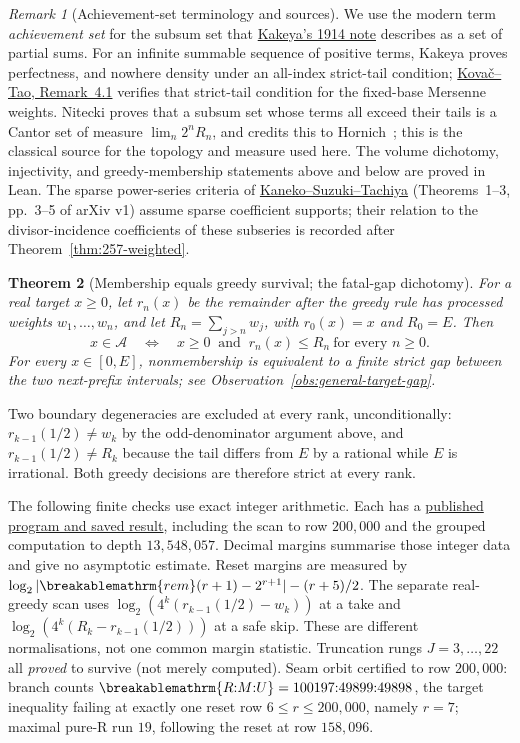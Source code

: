\documentclass[11pt]{article}
\theoremstyle{plain}
\newtheorem{thm}{Theorem}[section]
\theoremstyle{definition}
\theoremstyle{remark}
\newtheorem{rem}[thm]{Remark}
\renewcommand{\mathrm}[1]{\ifmmode\breakablemathrm{#1}\else\textrm{#1}\fi}%
\begin{document}
\begin{rem}[Achievement-set terminology and sources]
We use the modern term \emph{achievement set} for the subsum set that
\href{https://doi.org/10.11429/ptmps1907.7.14_250}{Kakeya's 1914 note} describes
as a set of partial sums.  For an infinite summable sequence of positive
terms, Kakeya proves perfectness, and nowhere density under an all-index strict-tail
condition; \href{https://arxiv.org/abs/2406.17593v4}{Kova\v{c}--Tao,
Remark~4.1} verifies that strict-tail condition for the fixed-base Mersenne
weights.  Nitecki proves that a subsum set whose terms all exceed their tails
is a Cantor set of measure $\lim_n2^nR_n$, and credits this to
Hornich~\cite[Theorem~4(1), p.~9]{nitecki2013}; this is the classical source for
the topology and measure used here.  The
volume dichotomy, injectivity, and greedy-membership statements above and
below are proved in Lean.  The sparse power-series criteria
of \href{https://arxiv.org/abs/2601.20743}{Kaneko--Suzuki--Tachiya}
(Theorems~1--3, pp.~3--5 of arXiv v1) assume sparse coefficient supports;
their relation to the divisor-incidence coefficients of these subseries is
recorded after Theorem~\ref{thm:257-weighted}.
\end{rem}

\begin{thm}[Membership equals greedy survival; the fatal-gap dichotomy]
\label{thm:greedy-survival}
For a real target $x\ge0$, let $r_n(x)$ be the remainder after the
greedy rule has processed weights $w_1,\ldots,w_n$, and let
$R_n=\sum_{j>n}w_j$, with $r_0(x)=x$ and $R_0=E$.  Then
\[
 x\in\mathcal A\quad\Longleftrightarrow\quad
 x\ge0\ \text{ and }\ r_n(x)\le R_n\ \text{for every }n\ge0.
\]
For every $x\in[0,E]$, nonmembership is equivalent to a finite
strict gap between the two next-prefix intervals; see
Observation~\ref{obs:general-target-gap}.
\end{thm}

Two boundary degeneracies are excluded at every rank, unconditionally: $r_{k-1}(1/2)\ne w_k$ by the
odd-denominator argument above, and $r_{k-1}(1/2)\ne R_k$ because the tail differs from $E$ by a
rational while $E$ is irrational. Both greedy decisions are therefore strict at every rank.

The following finite checks use exact integer arithmetic.  Each has a
\href{https://github.com/wcook04/plectis-erdos/tree/f757115e03bebe5c04431a147da559015c680a37/research/experiments/erdos257}{published program and saved result},
including the scan to row $200{,}000$ and the grouped computation to
depth $13{,}548{,}057$.  Decimal margins summarise those integer data and
give no asymptotic estimate.
Reset margins are measured by
$\log_2|\mathrm{rem}(r+1)-2^{r+1}|-(r+5)/2$.
The separate real-greedy scan uses
$\log_2(4^k(r_{k-1}(1/2)-w_k))$ at a take and
$\log_2(4^k(R_k-r_{k-1}(1/2)))$ at a safe skip.
These are different normalisations, not one common margin statistic.
Truncation rungs $J = 3,\dots,22$ all \emph{proved} to survive (not merely computed). Seam orbit
certified to row $200{,}000$: branch counts $\mathrm{R{:}M{:}U} = 100197{:}49899{:}49898$, the
target inequality failing at exactly one reset row $6\le r\le200{,}000$, namely $r = 7$; maximal pure-R run $19$, following
the reset at row $158{,}096$.
\end{document}
